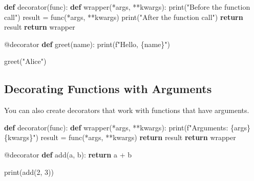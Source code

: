 \documentclass[
  letterpaper,
  DIV=11,
  numbers=noendperiod]{scrreprt}
\newenvironment{Shaded}{\begin{snugshade}}{\end{snugshade}}
\newcommand{\AttributeTok}[1]{\textcolor[rgb]{0.40,0.45,0.13}{#1}}
\newcommand{\BuiltInTok}[1]{\textcolor[rgb]{0.00,0.23,0.31}{#1}}
\newcommand{\ControlFlowTok}[1]{\textcolor[rgb]{0.00,0.23,0.31}{\textbf{#1}}}
\newcommand{\DecValTok}[1]{\textcolor[rgb]{0.68,0.00,0.00}{#1}}
\newcommand{\KeywordTok}[1]{\textcolor[rgb]{0.00,0.23,0.31}{\textbf{#1}}}
\newcommand{\NormalTok}[1]{\textcolor[rgb]{0.00,0.23,0.31}{#1}}
\newcommand{\OperatorTok}[1]{\textcolor[rgb]{0.37,0.37,0.37}{#1}}
\newcommand{\SpecialCharTok}[1]{\textcolor[rgb]{0.37,0.37,0.37}{#1}}
\newcommand{\SpecialStringTok}[1]{\textcolor[rgb]{0.13,0.47,0.30}{#1}}
\newcommand{\StringTok}[1]{\textcolor[rgb]{0.13,0.47,0.30}{#1}}
\begin{document}
\begin{Shaded}
\begin{Highlighting}[]
\KeywordTok{def}\NormalTok{ decorator(func):}
    \KeywordTok{def}\NormalTok{ wrapper(}\OperatorTok{*}\NormalTok{args, }\OperatorTok{**}\NormalTok{kwargs):}
        \BuiltInTok{print}\NormalTok{(}\StringTok{"Before the function call"}\NormalTok{)}
\NormalTok{        result }\OperatorTok{=}\NormalTok{ func(}\OperatorTok{*}\NormalTok{args, }\OperatorTok{**}\NormalTok{kwargs)}
        \BuiltInTok{print}\NormalTok{(}\StringTok{"After the function call"}\NormalTok{)}
        \ControlFlowTok{return}\NormalTok{ result}
    \ControlFlowTok{return}\NormalTok{ wrapper}

\AttributeTok{@decorator}
\KeywordTok{def}\NormalTok{ greet(name):}
    \BuiltInTok{print}\NormalTok{(}\SpecialStringTok{f"Hello, }\SpecialCharTok{\{}\NormalTok{name}\SpecialCharTok{\}}\SpecialStringTok{"}\NormalTok{)}

\NormalTok{greet(}\StringTok{"Alice"}\NormalTok{)}
\end{Highlighting}
\end{Shaded}

\subsection{Decorating Functions with
Arguments}\label{decorating-functions-with-arguments}

You can also create decorators that work with functions that have
arguments.

\begin{Shaded}
\begin{Highlighting}[]
\KeywordTok{def}\NormalTok{ decorator(func):}
    \KeywordTok{def}\NormalTok{ wrapper(}\OperatorTok{*}\NormalTok{args, }\OperatorTok{**}\NormalTok{kwargs):}
        \BuiltInTok{print}\NormalTok{(}\SpecialStringTok{f"Arguments: }\SpecialCharTok{\{}\NormalTok{args}\SpecialCharTok{\}}\SpecialStringTok{ }\SpecialCharTok{\{}\NormalTok{kwargs}\SpecialCharTok{\}}\SpecialStringTok{"}\NormalTok{)}
\NormalTok{        result }\OperatorTok{=}\NormalTok{ func(}\OperatorTok{*}\NormalTok{args, }\OperatorTok{**}\NormalTok{kwargs)}
        \ControlFlowTok{return}\NormalTok{ result}
    \ControlFlowTok{return}\NormalTok{ wrapper}

\AttributeTok{@decorator}
\KeywordTok{def}\NormalTok{ add(a, b):}
    \ControlFlowTok{return}\NormalTok{ a }\OperatorTok{+}\NormalTok{ b}

\BuiltInTok{print}\NormalTok{(add(}\DecValTok{2}\NormalTok{, }\DecValTok{3}\NormalTok{))}
\end{Highlighting}
\end{Shaded}
\end{document}

